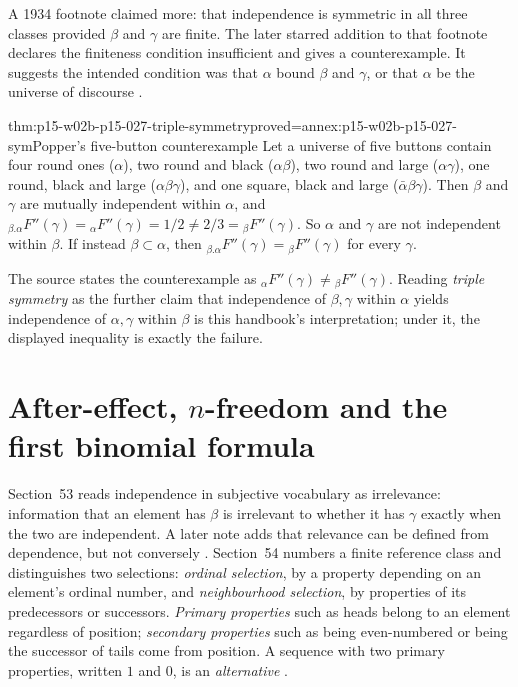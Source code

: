 A 1934 footnote claimed more: that independence is symmetric in all
three classes provided \(\beta\) and \(\gamma\) are finite. The later
starred addition to that footnote declares the finiteness condition
insufficient and gives a counterexample. It suggests the intended
condition was that \(\alpha\) bound \(\beta\) and \(\gamma\), or that
\(\alpha\) be the universe of discourse
\parencite[\S53, note~4]{Popper2002LogicDiscoveryUI}.

\begin{hbtheorem}{thm:p15-w02b-p15-027-triple-symmetry}{proved=annex:p15-w02b-p15-027-sym}{Popper's five-button counterexample}
Let a universe of five buttons contain four round ones (\(\alpha\)),
two round and black (\(\alpha\beta\)), two round and large
(\(\alpha\gamma\)), one round, black and large (\(\alpha\beta\gamma\)),
and one square, black and large (\(\bar\alpha\beta\gamma\)).
Then \(\beta\) and \(\gamma\) are mutually independent within
\(\alpha\), and
\({}_{\beta.\alpha}F''(\gamma)={}_{\alpha}F''(\gamma)=1/2\neq2/3={}_{\beta}F''(\gamma)\).
So \(\alpha\) and \(\gamma\) are not independent within \(\beta\).
If instead \(\beta\subset\alpha\), then
\({}_{\beta.\alpha}F''(\gamma)={}_{\beta}F''(\gamma)\) for every \(\gamma\).
\end{hbtheorem}

The source states the counterexample as
\({}_{\alpha}F''(\gamma)\neq{}_{\beta}F''(\gamma)\). Reading
\emph{triple symmetry} as the further claim that independence of
\(\beta,\gamma\) within \(\alpha\) yields independence of
\(\alpha,\gamma\) within \(\beta\) is this handbook's interpretation;
under it, the displayed inequality is exactly the failure.

\section{After-effect, \texorpdfstring{\(n\)}{n}-freedom and the first binomial formula}
\label{sec:p15-w02b-p15-027-n-freedom}

Section~53 reads independence in subjective vocabulary as irrelevance:
information that an element has \(\beta\) is irrelevant to whether it
has \(\gamma\) exactly when the two are independent. A later note adds
that relevance can be defined from dependence, but not conversely
\parencite[\S53, note~*1]{Popper2002LogicDiscoveryUI}.
Section~54 numbers a finite reference class and distinguishes two
selections: \emph{ordinal selection}, by a property depending on an
element's ordinal number, and \emph{neighbourhood selection}, by
properties of its predecessors or successors. \emph{Primary properties}
such as heads belong to an element regardless of position; \emph{secondary
properties} such as being even-numbered or being the successor of tails
come from position. A sequence with two primary properties, written
\(1\) and \(0\), is an \emph{alternative}
\parencite[\S54]{Popper2002LogicDiscoveryUI}.

